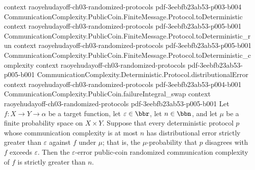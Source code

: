 \begin{theorem}
  {context}
  {raoyehudayoff-ch03-randomized-protocols}
  {pdf-3eebfb23ab53-p003-b004}
\proofstep
  {CommunicationComplexity.PublicCoin.FiniteMessage.Protocol.toDeterministic}
  {context}
  {raoyehudayoff-ch03-randomized-protocols}
  {pdf-3eebfb23ab53-p005-b001}
\proofstep
  {CommunicationComplexity.PublicCoin.FiniteMessage.Protocol.toDeterministic_run}
  {context}
  {raoyehudayoff-ch03-randomized-protocols}
  {pdf-3eebfb23ab53-p005-b001}
\proofstep
  {CommunicationComplexity.PublicCoin.FiniteMessage.Protocol.toDeterministic_complexity}
  {context}
  {raoyehudayoff-ch03-randomized-protocols}
  {pdf-3eebfb23ab53-p005-b001}
\proofstep
  {CommunicationComplexity.Deterministic.Protocol.distributionalError}
  {context}
  {raoyehudayoff-ch03-randomized-protocols}
  {pdf-3eebfb23ab53-p004-b001}
\proofstep
  {CommunicationComplexity.PublicCoin.failureIntegral_swap}
  {context}
  {raoyehudayoff-ch03-randomized-protocols}
  {pdf-3eebfb23ab53-p005-b001}
Let $f : X \to Y \to \alpha$ be a target function, let $\varepsilon \in \bbr$, let $n
\in \bbn$, and let $\mu$ be a finite probability space on $X \times Y$. Suppose that
every deterministic protocol $p$ whose communication complexity is at most $n$ has
distributional error strictly greater than $\varepsilon$ against $f$ under $\mu$; that
is, the $\mu$-probability that $p$ disagrees with $f$ exceeds $\varepsilon$. Then the
$\varepsilon$-error public-coin randomized communication complexity of $f$ is strictly
greater than $n$.
\end{theorem}
